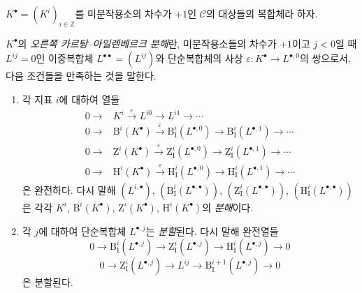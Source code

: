 \begin{env}[11.4.2]
\label{0.11.4.2-fr}
$K^\bullet=(K^i)_{i\in\mathbb Z}$를 미분작용소의 차수가 $+1$인
$\mathcal C$의 대상들의 복합체라 하자.

$K^\bullet$의 \emph{오른쪽 카르탕--아일렌베르크 분해}란,
미분작용소들의 차수가 $+1$이고 $j<0$일 때 $L^{ij}=0$인 이중복합체
$L^{\bullet\bullet}=(L^{ij})$와 단순복합체의 사상
$\varepsilon:K^\bullet\to L^{\bullet,0}$의 쌍으로서, 다음 조건들을
만족하는 것을 말한다.
\begin{enumerate}
  \item[(i)] 각 지표 $i$에 대하여 열들
    \[
    \begin{aligned}
      0\longrightarrow{}&K^i\xrightarrow{\varepsilon}L^{i0}
        \longrightarrow L^{i1}\longrightarrow\cdots\\
      0\longrightarrow{}&\mathrm B^i(K^\bullet)\xrightarrow{\varepsilon}
        \mathrm B_{\mathrm I}^i(L^{\bullet,0})
        \longrightarrow\mathrm B_{\mathrm I}^i(L^{\bullet,1})
        \longrightarrow\cdots\\
      0\longrightarrow{}&\mathrm Z^i(K^\bullet)\xrightarrow{\varepsilon}
        \mathrm Z_{\mathrm I}^i(L^{\bullet,0})
        \longrightarrow\mathrm Z_{\mathrm I}^i(L^{\bullet,1})
        \longrightarrow\cdots\\
      0\longrightarrow{}&\mathrm H^i(K^\bullet)\xrightarrow{\varepsilon}
        \mathrm H_{\mathrm I}^i(L^{\bullet,0})
        \longrightarrow\mathrm H_{\mathrm I}^i(L^{\bullet,1})
        \longrightarrow\cdots
    \end{aligned}
    \]
    은 완전하다. 다시 말해 $(L^{i,\bullet})$,
    $(\mathrm B_{\mathrm I}^i(L^{\bullet,\bullet}))$,
    $(\mathrm Z_{\mathrm I}^i(L^{\bullet,\bullet}))$,
    $(\mathrm H_{\mathrm I}^i(L^{\bullet,\bullet}))$은 각각 $K^i$,
    $\mathrm B^i(K^\bullet)$, $\mathrm Z^i(K^\bullet)$,
    $\mathrm H^i(K^\bullet)$의 \emph{분해}이다.
  \item[(ii)] 각 $j$에 대하여 단순복합체 $L^{\bullet,j}$는
    \emph{분할}된다. 다시 말해 완전열들
    \[
      \label{0.11.4.2.1-fr}
      0\longrightarrow\mathrm B_{\mathrm I}^i(L^{\bullet,j})
      \longrightarrow\mathrm Z_{\mathrm I}^i(L^{\bullet,j})
      \longrightarrow\mathrm H_{\mathrm I}^i(L^{\bullet,j})
      \longrightarrow0
      \tag{11.4.2.1}
    \]
    \[
      \label{0.11.4.2.2-fr}
      0\longrightarrow\mathrm Z_{\mathrm I}^i(L^{\bullet,j})
      \longrightarrow L^{ij}
      \longrightarrow\mathrm B_{\mathrm I}^{i+1}(L^{\bullet,j})
      \longrightarrow0
      \tag{11.4.2.2}
    \]
    은 분할된다.
\end{enumerate}


\end{env}
